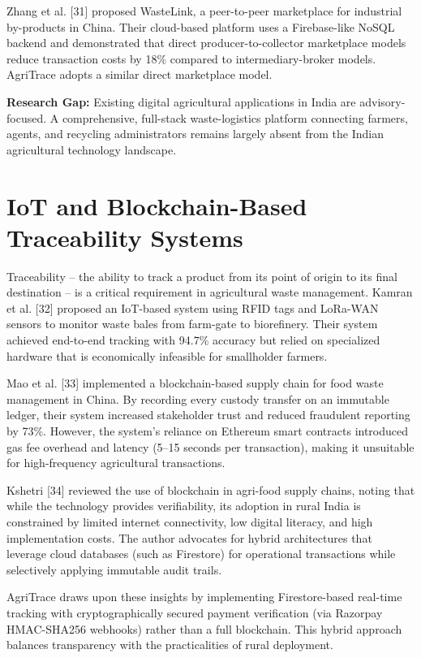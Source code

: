 \documentclass[a4paper,12pt,oneside]{report}
\begin{document}
Zhang et al. [31] proposed WasteLink, a peer-to-peer marketplace for industrial by-products in China. Their cloud-based platform uses a Firebase-like NoSQL backend and demonstrated that direct producer-to-collector marketplace models reduce transaction costs by 18\% compared to intermediary-broker models. AgriTrace adopts a similar direct marketplace model.

\textbf{Research Gap:} Existing digital agricultural applications in India are advisory-focused. A comprehensive, full-stack waste-logistics platform connecting farmers, agents, and recycling administrators remains largely absent from the Indian agricultural technology landscape.

\section{IoT and Blockchain-Based Traceability Systems}

\noindent Traceability -- the ability to track a product from its point of origin to its final destination -- is a critical requirement in agricultural waste management. Kamran et al. [32] proposed an IoT-based system using RFID tags and LoRa-WAN sensors to monitor waste bales from farm-gate to biorefinery. Their system achieved end-to-end tracking with 94.7\% accuracy but relied on specialized hardware that is economically infeasible for smallholder farmers.

Mao et al. [33] implemented a blockchain-based supply chain for food waste management in China. By recording every custody transfer on an immutable ledger, their system increased stakeholder trust and reduced fraudulent reporting by 73\%. However, the system's reliance on Ethereum smart contracts introduced gas fee overhead and latency (5--15 seconds per transaction), making it unsuitable for high-frequency agricultural transactions.

Kshetri [34] reviewed the use of blockchain in agri-food supply chains, noting that while the technology provides verifiability, its adoption in rural India is constrained by limited internet connectivity, low digital literacy, and high implementation costs. The author advocates for hybrid architectures that leverage cloud databases (such as Firestore) for operational transactions while selectively applying immutable audit trails.

AgriTrace draws upon these insights by implementing Firestore-based real-time tracking with cryptographically secured payment verification (via Razorpay HMAC-SHA256 webhooks) rather than a full blockchain. This hybrid approach balances transparency with the practicalities of rural deployment.
\end{document}
